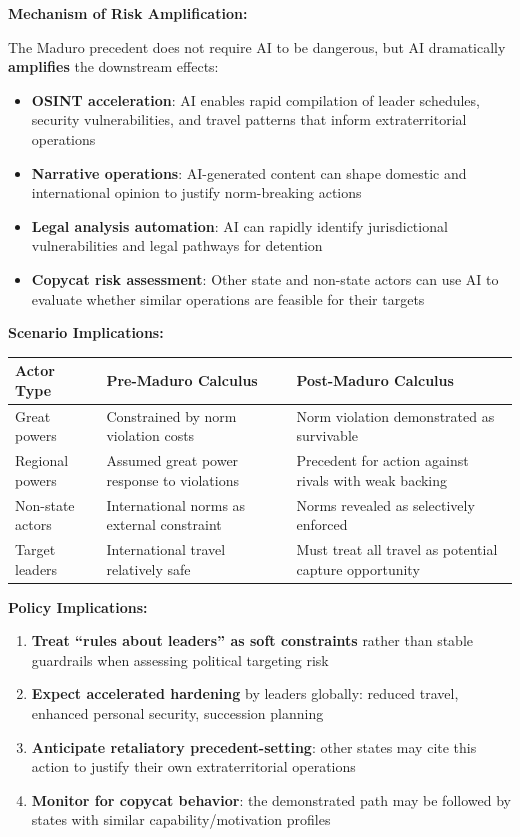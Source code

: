 \documentclass[11pt,letterpaper]{article}
\makeatletter
\newcommand{\etraneed}[1]{\par\if@nobreak\else\penalty\z@\ifdim\pagegoal<\maxdimen\ifdim\dimexpr\pagegoal-\pagetotal\relax<\dimexpr#1\relax\newpage\fi\fi\fi}
\makeatother
\begin{document}
\textbf{Mechanism of Risk Amplification:}

The Maduro precedent does not require AI to be dangerous, but AI dramatically \textbf{amplifies} the downstream effects:

\begin{itemize}
  \item \textbf{OSINT acceleration}: AI enables rapid compilation of leader schedules, security vulnerabilities, and travel patterns that inform extraterritorial operations
  \item \textbf{Narrative operations}: AI-generated content can shape domestic and international opinion to justify norm-breaking actions
  \item \textbf{Legal analysis automation}: AI can rapidly identify jurisdictional vulnerabilities and legal pathways for detention
  \item \textbf{Copycat risk assessment}: Other state and non-state actors can use AI to evaluate whether similar operations are feasible for their targets
\end{itemize}

\textbf{Scenario Implications:}

\begin{center}
\small
\begin{tabular}{L{2.5cm}L{4.5cm}L{5cm}}
\toprule
\textbf{Actor Type} & \textbf{Pre-Maduro Calculus} & \textbf{Post-Maduro Calculus} \\
\midrule
Great powers & Constrained by norm violation costs & Norm violation demonstrated as survivable \\
Regional powers & Assumed great power response to violations & Precedent for action against rivals with weak backing \\
Non-state actors & International norms as external constraint & Norms revealed as selectively enforced \\
Target leaders & International travel relatively safe & Must treat all travel as potential capture opportunity \\
\bottomrule
\end{tabular}
\end{center}

\etraneed{5\baselineskip}
\textbf{Policy Implications:}
\begin{enumerate}
  \item \textbf{Treat ``rules about leaders'' as soft constraints} rather than stable guardrails when assessing political targeting risk
  \item \textbf{Expect accelerated hardening} by leaders globally: reduced travel, enhanced personal security, succession planning
  \item \textbf{Anticipate retaliatory precedent-setting}: other states may cite this action to justify their own extraterritorial operations
  \item \textbf{Monitor for copycat behavior}: the demonstrated path may be followed by states with similar capability/motivation profiles
\end{enumerate}
\end{document}
